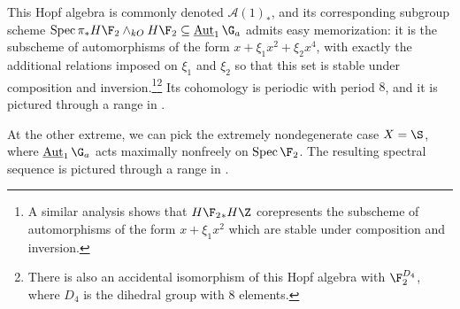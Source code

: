 \begin{example}
\begin{center}
\end{center}
This Hopf algebra is commonly denoted $\mathcal A(1)_*$, and its corresponding subgroup scheme $\Spec \pi_* H\F_2 \sm_{kO} H\F_2 \subseteq \InternalAut_1 \G_a$ admits easy memorization: it is the subscheme of automorphisms of the form $x + \xi_1 x^2 + \xi_2 x^4$, with exactly the additional relations imposed on $\xi_1$ and $\xi_2$ so that this set is stable under composition and inversion.\footnote{A similar analysis shows that $H\F_2{}_* H\Z$ corepresents the subscheme of automorphisms of the form $x + \xi_1 x^2$ which are stable under composition and inversion.}\footnote{There is also an accidental isomorphism of this Hopf algebra with $\F_2^{D_4}$, where $D_4$ is the dihedral group with $8$ elements.}  Its cohomology is periodic with period $8$, and it is pictured through a range in .
\end{example}

\begin{example}
At the other extreme, we can pick the extremely nondegenerate case $X = \S$, where $\InternalAut_1 \G_a$ acts maximally nonfreely on $\Spec \F_2$.  The resulting spectral sequence is pictured through a range in .
\end{example}


